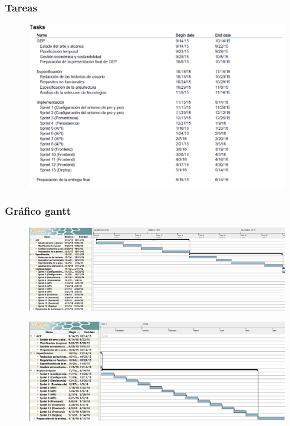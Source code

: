 \documentclass[12pt]{article} %
\begin{document}
\begin{landscape}

\subsubsection{Tareas}
\begin{figure}[ht!]
\center
\includegraphics[width=\textwidth,height=\textheight,keepaspectratio]{Task.PNG}
\label{fig:task}
\end{figure}

\newpage
\subsubsection{Gráfico gantt}

\begin{figure}[ht!]
\center
\includegraphics[width=\textwidth,height=\textheight,keepaspectratio]{Gantt_1.PNG}
\label{fig:gantt_1}
\end{figure}

\begin{figure}[ht!]
\center
\includegraphics[width=\textwidth,height=\textheight,keepaspectratio]{Gantt_2.PNG}
\label{fig:gantt_2}
\end{figure}

\end{landscape}
\newpage
\end{document}
